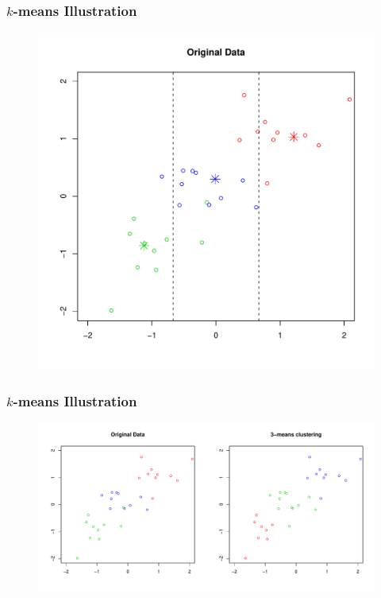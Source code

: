 \documentclass[xcolor=x11names,compress]{beamer}\usepackage[]{graphicx}\usepackage[]{color}
\begin{document}
\begin{frame}
  \frametitle{$k$-means Illustration}
\begin{figure}
   \centering
   \includegraphics[scale=0.45]{Figures/kmean11.pdf}
 \end{figure}

\end{frame}


\begin{frame}
  \frametitle{$k$-means Illustration}
\begin{figure}
   \centering
   \includegraphics[scale=0.38]{Figures/kmean3.pdf}
 \end{figure}

\end{frame}
\end{document}
